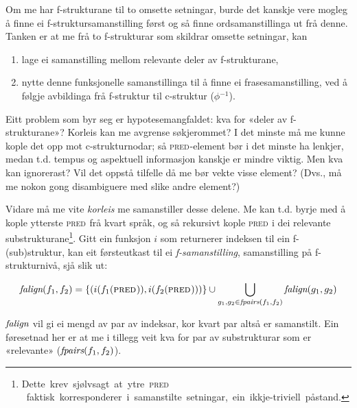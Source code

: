 \documentclass[11pt,a4paper,oneside,draft]{book}
\newcommand{\F}[2]{\textsc{#1}\ensuremath{_{#2}}}
\newcommand{\PRED}{\F{pred}{}}
\newcommand{\falign}{\ensuremath{\operatorname{\emph{falign}}}}
\newcommand{\fpairs}{\ensuremath{\operatorname{\emph{fpairs}}}}
\begin{document}

Om me har f-strukturane til to omsette setningar, burde det kanskje
vere mogleg å finne ei f-struktursamanstilling først og så finne
ordsamanstillinga ut frå denne. Tanken er at me frå to f-strukturar
som skildrar omsette setningar, kan
\begin{enumerate}
\item lage ei samanstilling mellom relevante deler av f-strukturane,
\item nytte denne funksjonelle samanstillinga til å finne ei
   frasesamanstilling, ved å følgje avbildinga frå f-struktur til
   c-struktur ($\phi{}^{-1}$).
\end{enumerate}
Eitt problem som byr seg er hypotesemangfaldet: kva for «deler av
f-strukturane»? Korleis kan me avgrense søkjerommet? I det minste må
me kunne kople det opp mot c-strukturnodar; så \PRED-element bør i det
minste ha lenkjer, medan t.d. tempus og aspektuell informasjon kanskje
er mindre viktig. Men kva kan ignorerast? Vil det oppstå tilfelle då
me bør vekte visse element? (Dvs., må me nokon gong disambiguere med
slike andre element?)

Vidare må me vite \emph{korleis} me samanstiller desse delene. Me kan
t.d. byrje med å kople ytterste \PRED{} frå kvart språk, og så
rekursivt kople \PRED{} i dei relevante
substrukturane\footnote{Dette~krev~sjølvsagt~at~ytre~\PRED{}~faktisk~korresponderer~i~samanstilte~setningar,~ein~ikkje-triviell~påstand.}. Gitt
ein funksjon $i$ som returnerer indeksen til ein f-(sub)struktur, kan
eit førsteutkast til ei \emph{f-samanstilling}, samanstilling på
f-strukturnivå, sjå slik ut:

\[
\falign(f_{1}, f_{2}) =
\{ (i(f_{1}(\PRED)), i(f_{2}(\PRED))) \}
\cup
\bigcup_{g_{1},g_{2}\in \fpairs(f_{1},f_{2})} \falign(g_{1}, g_{2})
\]

\falign{} vil gi ei mengd av par av indeksar, kor kvart par altså er
samanstilt. Ein føresetnad her er at me i tillegg veit kva for par av
substrukturar som er «relevante» ($\fpairs(f_{1},f_{2})$).
\end{document}
